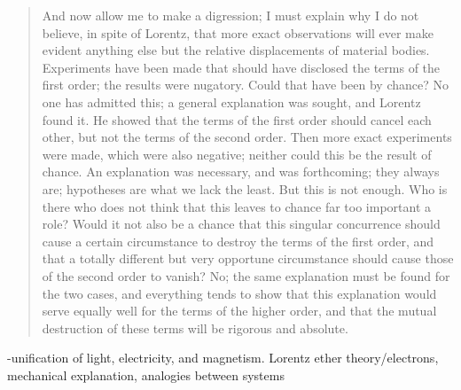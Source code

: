 \begin{quote}
     And now allow me to make a digression; I must explain why I do not believe, in spite of Lorentz, that more exact observations will ever make evident anything else but the relative displacements of material bodies.  Experiments have been made that should have disclosed the terms of the first order; the results were nugatory.  Could that have been by chance?  No one has admitted this; a general explanation was sought, and Lorentz found it.  He showed that the terms of the first order should cancel each other, but not the terms of the second order.  Then more exact experiments were made, which were also negative; neither could this be the result of chance.  An explanation was necessary, and was forthcoming; they always are; hypotheses are what we lack the least.  But this is not enough.  Who is there who does not think that this leaves to chance far too important a role?  Would it not also be a chance that this singular concurrence should cause a certain circumstance to destroy the terms of the first order, and that a totally different but very opportune circumstance should cause those of the second order to vanish?  No; the same explanation must be found for the two cases, and everything tends to show that this explanation would serve equally well for the terms of the higher order, and that the mutual destruction of these terms will be rigorous and absolute.
     
     \citep[p. 168-172]{Poincare1952}
     
 \end{quote}
 
 -unification of light, electricity, and magnetism.  Lorentz ether theory/electrons, mechanical explanation, analogies between systems
 
